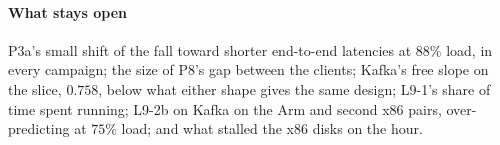 \documentclass[10pt,journal,onecolumn]{IEEEtran}
\newcommand{\kafka}{Kafka}
\begin{document}
\paragraph{What stays open} P3a's small shift of the fall toward shorter end-to-end latencies at $88\%$ load,
in every campaign; the size of P8's gap between the clients; \kafka{}'s free slope on the slice,
$0.758$, below what either shape gives the same design; L9-1's share of time spent running; L9-2b
on \kafka{} on the Arm and second x86 pairs, over-predicting at $75\%$ load; and what stalled the
x86 disks on the hour.



\end{document}
